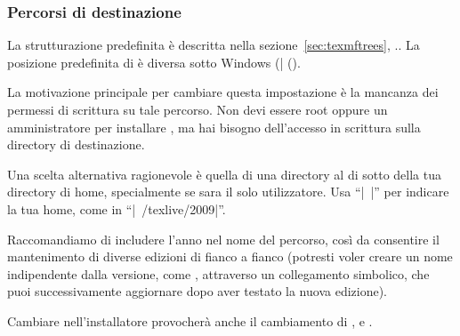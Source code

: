 \documentclass{article}
\begin{document}
\subsubsection{Percorsi di destinazione}
\label{sec:directories}

La strutturazione predefinita è descritta nella
sezione~\ref{sec:texmftrees}, \p.\pageref{sec:texmftrees}. La posizione
predefinita di  è diversa sotto Windows
(|%
(). 

La motivazione principale per cambiare questa impostazione è la mancanza
dei permessi di scrittura su tale percorso. Non devi essere root oppure un
amministratore per installare \TL, ma hai bisogno dell'accesso in
scrittura sulla directory di destinazione.

Una scelta alternativa ragionevole è quella di una directory al di sotto
della tua directory di home, specialmente se sara il solo utilizzatore.
Usa ``|~|'' per indicare la tua home, come in ``|~/texlive/2009|''.

Raccomandiamo di includere l'anno nel nome del percorso, così da
consentire il mantenimento di diverse edizioni di \TL{} fianco a fianco
(potresti voler creare un nome indipendente dalla versione, come
, attraverso un collegamento simbolico,
che puoi successivamente aggiornare dopo aver testato la nuova edizione).

Cambiare  nell'installatore provocherà anche il
cambiamento di ,  e
.
\end{document}
